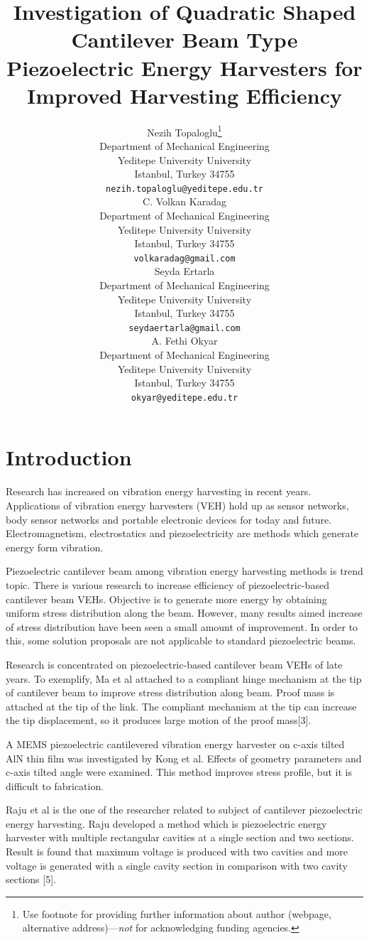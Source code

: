 \documentclass{article}
\title{Investigation of Quadratic Shaped Cantilever Beam Type Piezoelectric Energy Harvesters for Improved Harvesting Efficiency }
\author{
  Nezih Topaloglu\thanks{Use footnote for providing further
    information about author (webpage, alternative
    address)---\emph{not} for acknowledging funding agencies.} \\
  Department of Mechanical Engineering\\
  Yeditepe University University\\
 Istanbul, Turkey 34755 \\
  \texttt{nezih.topaloglu@yeditepe.edu.tr} \\
  \And
  C. Volkan Karadag \\
Department of Mechanical Engineering\\
  Yeditepe University University\\
 Istanbul, Turkey 34755 \\
  \texttt{volkaradag@gmail.com} \\
  \AND
  Seyda Ertarla \\
Department of Mechanical Engineering\\
  Yeditepe University University\\
 Istanbul, Turkey 34755 \\
  \texttt{seydaertarla@gmail.com} \\
  \And
 A. Fethi Okyar \\
Department of Mechanical Engineering\\
  Yeditepe University University\\
 Istanbul, Turkey 34755 \\
  \texttt{okyar@yeditepe.edu.tr} \\
}
\begin{document}
\maketitle

\begin{abstract}
\lipsum[1]
\end{abstract}




\section{Introduction}
Research has increased on vibration energy harvesting in recent years. Applications of vibration energy harvesters (VEH) hold up as sensor networks, body sensor networks and portable electronic devices for today and future. Electromagnetism, electrostatics and piezoelectricity are methods which generate energy form vibration. 

Piezoelectric cantilever beam among vibration energy harvesting methods is trend topic. There is various research to increase efficiency of piezoelectric-based cantilever beam VEHs. Objective is to generate more energy by obtaining uniform stress distribution along the beam. However, many results aimed increase of stress distribution have been seen a small amount of improvement. In order to this, some solution proposals are not applicable to standard piezoelectric beams.

Research is concentrated on piezoelectric-based cantilever beam VEHs of late years. To exemplify, Ma et al attached to a compliant hinge mechanism at the tip of cantilever beam to improve stress distribution along beam. Proof mass is attached at the tip of the link. The compliant mechanism at the tip can increase the tip displacement, so it produces large motion of the proof mass[3].

A MEMS piezoelectric cantilevered vibration energy harvester on c-axis tilted AlN thin film was investigated by Kong et al. Effects of geometry parameters and c-axis tilted angle were examined. This method improves stress profile, but it is difficult to fabrication. 

Raju et al is the one of the researcher related to subject of cantilever piezoelectric energy harvesting. Raju developed a method which is piezoelectric energy harvester with multiple rectangular cavities at a single section and two sections. Result is found that maximum voltage is produced with two cavities and more voltage is generated with a single cavity section in comparison with two cavity sections [5].
\end{document}
